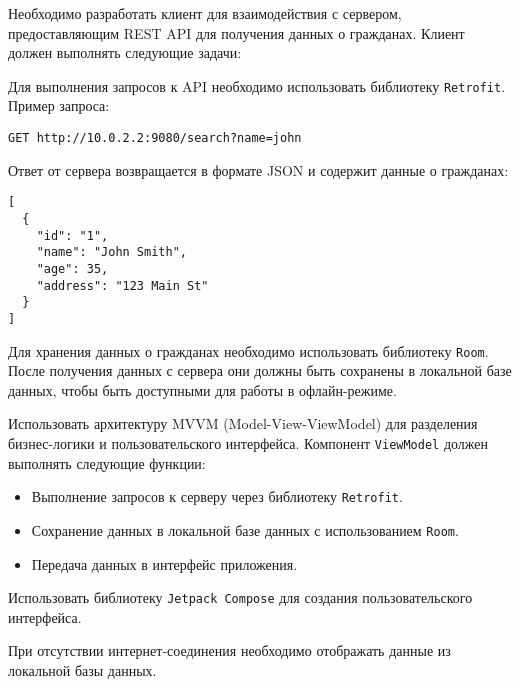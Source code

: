 
Необходимо разработать клиент для взаимодействия с сервером, предоставляющим REST API для получения данных о гражданах. Клиент должен выполнять следующие задачи:


Для выполнения запросов к API необходимо использовать библиотеку \texttt{Retrofit}. Пример запроса:

\begin{verbatim}
GET http://10.0.2.2:9080/search?name=john
\end{verbatim}

Ответ от сервера возвращается в формате JSON и содержит данные о гражданах:

\begin{verbatim}
[
  {
    "id": "1",
    "name": "John Smith",
    "age": 35,
    "address": "123 Main St"
  }
]
\end{verbatim}

Для хранения данных о гражданах необходимо использовать библиотеку \texttt{Room}. После получения данных с сервера они должны быть сохранены в локальной базе данных, чтобы быть доступными для работы в офлайн-режиме.

Использовать архитектуру MVVM (Model-View-ViewModel) для разделения бизнес-логики и пользовательского интерфейса. Компонент \texttt{ViewModel} должен выполнять следующие функции:
\begin{itemize}
    \item Выполнение запросов к серверу через библиотеку \texttt{Retrofit}.
    \item Сохранение данных в локальной базе данных с использованием \texttt{Room}.
    \item Передача данных в интерфейс приложения.
\end{itemize}

Использовать библиотеку \texttt{Jetpack Compose} для создания пользовательского интерфейса.

При отсутствии интернет-соединения необходимо отображать данные из локальной базы данных.
